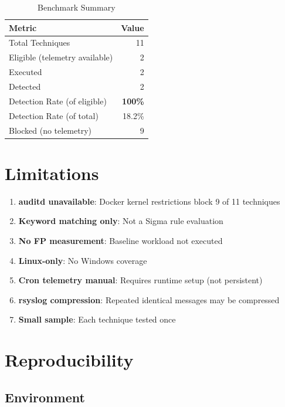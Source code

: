 \documentclass[11pt,a4paper]{article}
\begin{document}
\begin{table}[H]
    \centering
    \caption{Benchmark Summary}
    \begin{tabular}{lr}
        \toprule
        \textbf{Metric} & \textbf{Value} \\
        \midrule
        Total Techniques & 11 \\
        Eligible (telemetry available) & 2 \\
        Executed & 2 \\
        Detected & 2 \\
        Detection Rate (of eligible) & \textbf{100\%} \\
        Detection Rate (of total) & 18.2\% \\
        Blocked (no telemetry) & 9 \\
        \bottomrule
    \end{tabular}
\end{table}

\section{Limitations}

\begin{enumerate}
    \item \textbf{auditd unavailable}: Docker kernel restrictions block 9 of 11 techniques
    \item \textbf{Keyword matching only}: Not a Sigma rule evaluation
    \item \textbf{No FP measurement}: Baseline workload not executed
    \item \textbf{Linux-only}: No Windows coverage
    \item \textbf{Cron telemetry manual}: Requires runtime setup (not persistent)
    \item \textbf{rsyslog compression}: Repeated identical messages may be compressed
    \item \textbf{Small sample}: Each technique tested once
\end{enumerate}

\section{Reproducibility}

\subsection{Environment}
\end{document}
